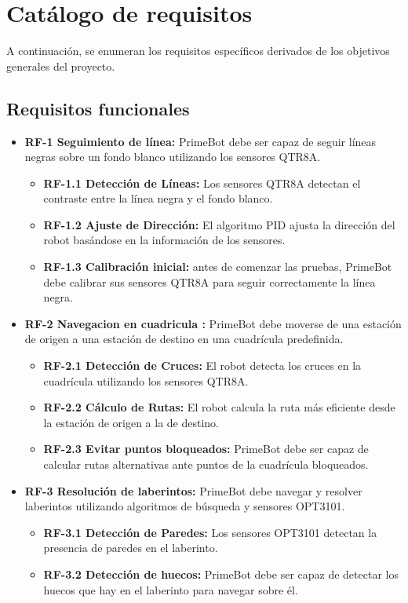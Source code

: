\section{Catálogo de requisitos}\label{catalogo-de-requisitos}

A continuación, se enumeran los requisitos específicos derivados de los objetivos generales del proyecto.
\subsection{Requisitos funcionales}\label{requisitos-funcionales}

\begin{itemize}
\tightlist
\item
  \textbf{RF-1 Seguimiento de línea:} PrimeBot debe ser capaz de seguir líneas negras sobre un fondo blanco utilizando los sensores QTR8A.
  \begin{itemize}
  \tightlist
  \item
    \textbf{RF-1.1 Detección de Líneas:} Los sensores QTR8A detectan el contraste entre la línea negra y el fondo blanco.
  \item
    \textbf{RF-1.2 Ajuste de Dirección:} El algoritmo PID ajusta la dirección del robot basándose en la información de los sensores.
  \item
    \textbf{RF-1.3 Calibración inicial:} antes de comenzar las pruebas, PrimeBot debe calibrar sus sensores QTR8A para seguir correctamente la línea negra.
\end{itemize}
\item
  \textbf{RF-2 Navegacion en cuadricula :} PrimeBot debe moverse de una estación de origen a una estación de destino en una cuadrícula predefinida.
  \begin{itemize}
  \tightlist
  \item
    \textbf{RF-2.1 Detección de Cruces:} El robot detecta los cruces en la cuadrícula utilizando los sensores QTR8A.
  \item
    \textbf{RF-2.2 Cálculo de Rutas:} El robot calcula la ruta más eficiente desde la estación de origen a la de destino.
  \item
    \textbf{RF-2.3 Evitar puntos bloqueados:} PrimeBot debe ser capaz de calcular rutas alternativas ante puntos de la cuadrícula bloqueados.
  \end{itemize}
\item
  \textbf{RF-3 Resolución de laberintos: } PrimeBot debe navegar y resolver laberintos utilizando algoritmos de búsqueda y sensores OPT3101.
  \begin{itemize}
  \tightlist
  \item
    \textbf{RF-3.1 Detección de Paredes: } Los sensores OPT3101 detectan la presencia de paredes en el laberinto.
  \item
    \textbf{RF-3.2 Detección de huecos: } PrimeBot debe ser capaz de detectar los huecos que hay en el laberinto para navegar sobre él.
  \end{itemize}

\end{itemize}


